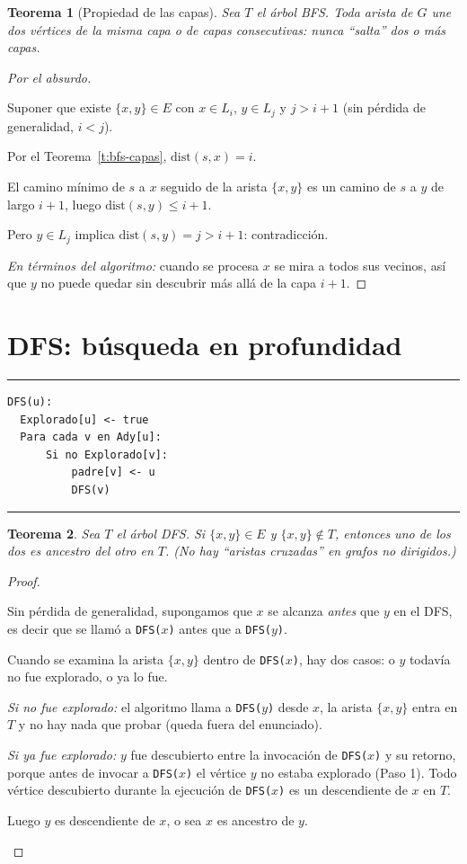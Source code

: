 \documentclass[11pt,a4paper]{article}
\theoremstyle{plain}
\newtheorem{teorema}{Teorema}[section]
\theoremstyle{definition}
\theoremstyle{remark}
\newcommand{\codigoinicio}{\begin{center}\begin{minipage}{0.93\textwidth}%
  \hrule\vspace{3pt}}
\newcommand{\codigofin}{\vspace{-4pt}\hrule\end{minipage}\end{center}}
\begin{document}
\begin{teorema}[Propiedad de las capas]
Sea $T$ el árbol BFS. Toda arista de $G$ une dos vértices de la \emph{misma} capa o de
capas \emph{consecutivas}: nunca ``salta'' dos o más capas.
\end{teorema}
\begin{proof}[Por el absurdo]
\begin{pasos}
\item Suponer que existe $\{x,y\}\in E$ con $x\in L_i$, $y\in L_j$ y $j>i+1$
(sin pérdida de generalidad, $i<j$).
\item Por el Teorema~\ref{t:bfs-capas}, $\mathrm{dist}(s,x)=i$.
\item El camino mínimo de $s$ a $x$ seguido de la arista $\{x,y\}$ es un camino de $s$ a
$y$ de largo $i+1$, luego $\mathrm{dist}(s,y)\le i+1$.
\item Pero $y\in L_j$ implica $\mathrm{dist}(s,y)=j>i+1$: contradicción.
\end{pasos}
\emph{En términos del algoritmo:} cuando se procesa $x$ se mira a todos sus vecinos, así
que $y$ no puede quedar sin descubrir más allá de la capa $i+1$.
\end{proof}

\section{DFS: búsqueda en profundidad}

\codigoinicio
\begin{verbatim}
DFS(u):
  Explorado[u] <- true
  Para cada v en Ady[u]:
      Si no Explorado[v]:
          padre[v] <- u
          DFS(v)
\end{verbatim}
\codigofin

\begin{teorema}
Sea $T$ el árbol DFS. Si $\{x,y\}\in E$ y $\{x,y\}\notin T$, entonces uno de los dos es
\emph{ancestro} del otro en $T$. (No hay ``aristas cruzadas'' en grafos no dirigidos.)
\end{teorema}
\begin{proof}
\begin{pasos}
\item Sin pérdida de generalidad, supongamos que $x$ se alcanza \emph{antes} que $y$ en
el DFS, es decir que se llamó a \texttt{DFS($x$)} antes que a \texttt{DFS($y$)}.
\item Cuando se examina la arista $\{x,y\}$ dentro de \texttt{DFS($x$)}, hay dos casos:
o $y$ todavía no fue explorado, o ya lo fue.
\item \emph{Si no fue explorado:} el algoritmo llama a \texttt{DFS($y$)} desde $x$,
la arista $\{x,y\}$ entra en $T$ y no hay nada que probar (queda fuera del enunciado).
\item \emph{Si ya fue explorado:} $y$ fue descubierto entre la invocación de
\texttt{DFS($x$)} y su retorno, porque antes de invocar a \texttt{DFS($x$)} el vértice
$y$ no estaba explorado (Paso 1). Todo vértice descubierto durante la ejecución de
\texttt{DFS($x$)} es un descendiente de $x$ en $T$.
\item Luego $y$ es descendiente de $x$, o sea $x$ es ancestro de $y$. \qedhere
\end{pasos}
\end{proof}
\end{document}
